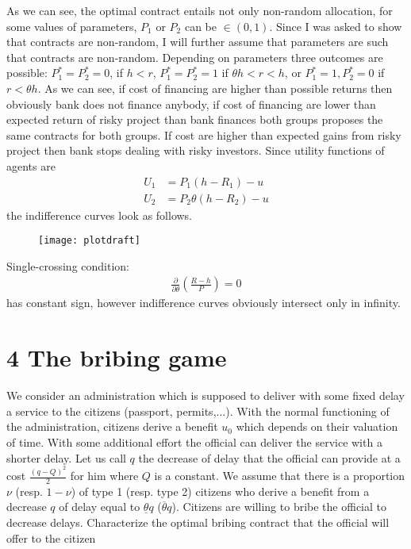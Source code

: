 \documentclass[a4paper]{article}
\newcommand{\ubar}{\overline}
\newcommand{\lbar}{\underline}
\begin{document}
\begin{enumerate}
	As we can see, the optimal contract entails not only non-random allocation, for some values of parameters, $P_1$ or $P_2$ can be $\in (0, 1)$. Since I was asked to show that contracts are non-random, I will further assume that parameters are such that contracts are non-random. Depending on parameters three outcomes are possible: $P_1^* = P_2^* = 0$, if $h < r$, $P_1^* = P_2^* = 1$ if $\theta h < r < h$, or $P_1^* = 1, P_2^* = 0$ if $r < \theta h$. As we can see, if cost of financing are higher than possible returns then obviously bank does not finance anybody, if cost of financing are lower than expected return of risky project than bank finances both groups proposes the same contracts for both groups. If cost are higher than expected gains from risky project then bank stops dealing with risky investors. Since utility functions of agents are
	\begin{align*}
	U_1 &= P_1(h - R_1) - u\\
	U_2 &= P_2\theta (h - R_2) - u 
	\end{align*}
	the indifference curves look as follows.
	\begin{figure}[H]
		\centering
		\texttt{[image: plotdraft]}
		\caption{}\label{fig1}
	\end{figure}
Single-crossing condition:
\begin{align*}
\frac{\partial}{\partial \theta} \left(\frac{R-h}{P}\right) = 0
\end{align*}
has constant sign, however indifference curves obviously intersect only in infinity.
\end{enumerate}	
\section*{4 The bribing game}
	We consider an administration which is supposed to deliver with some fixed delay
	a service to the citizens (passport, permits,...). With the normal functioning of the
	administration, citizens derive a benefit $u_0$ which depends on their valuation of time.
	With some additional effort the official can deliver the service with a shorter delay.
	Let us call $q$ the decrease of delay that the official can provide at a cost $\frac{(q - Q)^2}{2}$
	for him
	where $Q$ is a constant.
	We assume that there is a proportion $\nu$ (resp. $1-\nu$) of type 1 (resp. type 2) citizens
	who derive a benefit from a decrease $q$ of delay equal to $\lbar{\theta}q$ ($\ubar{\theta}q$). Citizens are willing to
	bribe the official to decrease delays.
	Characterize the optimal bribing contract that the official will offer to the citizen
	
\end{document}
